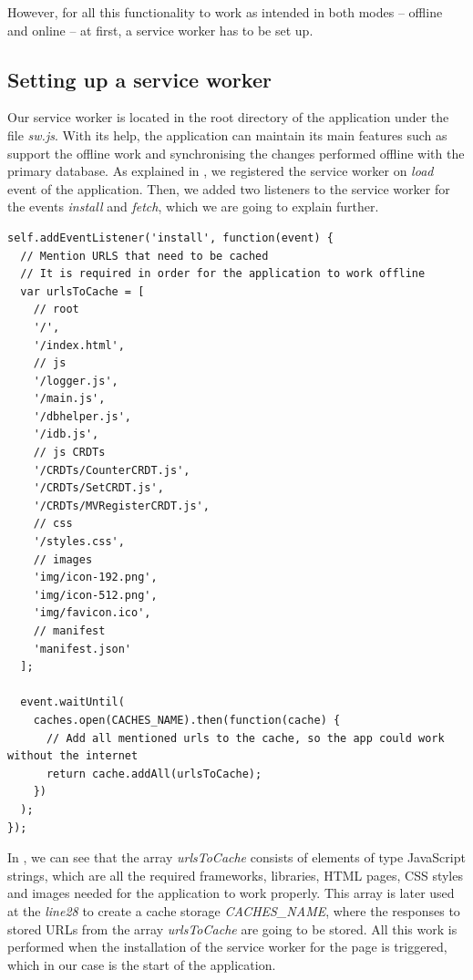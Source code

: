 However, for all this functionality to work as intended in both modes -- offline and online -- at first, a service worker has to be set up. 

\subsection*{Setting up a service worker}

Our service worker is located in the root directory of the application under the file \textit{sw.js}. With its help, the application can maintain its main features such as support the offline work and synchronising the changes performed offline with the primary database. As explained in , we registered the service worker on \textit{load} event of the application. Then, we added two listeners to the service worker for the events \textit{install} and \textit{fetch}, which we are going to explain further.

\begin{lstlisting}[caption={Code for caching necessary data for the client.}, label={lst:dev4}]
self.addEventListener('install', function(event) {
  // Mention URLS that need to be cached
  // It is required in order for the application to work offline
  var urlsToCache = [
    // root
    '/',
    '/index.html',
    // js
    '/logger.js',
    '/main.js',
    '/dbhelper.js',
    '/idb.js',
    // js CRDTs
    '/CRDTs/CounterCRDT.js',
    '/CRDTs/SetCRDT.js',
    '/CRDTs/MVRegisterCRDT.js',
    // css
    '/styles.css',
    // images
    'img/icon-192.png',
    'img/icon-512.png',
    'img/favicon.ico',
    // manifest
    'manifest.json'
  ];

  event.waitUntil(
    caches.open(CACHES_NAME).then(function(cache) {
      // Add all mentioned urls to the cache, so the app could work without the internet
      return cache.addAll(urlsToCache);
    })
  );
});
\end{lstlisting}

In , we can see that the array \textit{urlsToCache} consists of elements of type JavaScript strings, which are all the required frameworks, libraries, HTML pages, CSS styles and images needed for the application to work properly. This array is later used at the \textit{line28} to create a cache storage \textit{CACHES\_NAME}, where the responses to stored URLs from the array \textit{urlsToCache} are going to be stored. All this work is performed when the installation of the service worker for the page is triggered, which in our case is the start of the application. 

